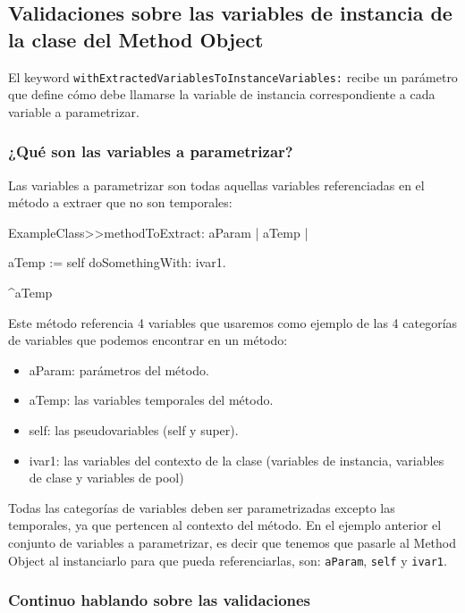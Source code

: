 \subsection*{Validaciones sobre las variables de instancia de la clase del Method Object}

El keyword \lstinline{withExtractedVariablesToInstanceVariables:} recibe un parámetro que define
cómo debe llamarse la variable de instancia correspondiente a cada variable a parametrizar. 

\subsubsection*{¿Qué son las variables a parametrizar?}
Las variables a parametrizar son todas aquellas variables referenciadas en el método a extraer que
no son temporales:

\begin{code}
ExampleClass>>methodToExtract: aParam
    | aTemp |

    aTemp := self doSomethingWith: ivar1.
    
    ^aTemp
\end{code}

Este método referencia 4 variables que usaremos como ejemplo de las 4 categorías de variables que podemos
encontrar en un método:

\begin{itemize}
    \item aParam: parámetros del método.
    \item aTemp: las variables temporales del método.
    \item self: las pseudovariables (self y super).
    \item ivar1: las variables del contexto de la clase (variables de instancia, variables de clase y variables de pool)
\end{itemize}

Todas las categorías de variables deben ser parametrizadas excepto las temporales, ya que pertencen
al contexto del método. En el ejemplo anterior el conjunto de variables a parametrizar, es decir que
tenemos que pasarle al Method Object al instanciarlo para que pueda referenciarlas, son: \lstinline{aParam},
\lstinline{self} y \lstinline{ivar1}.

\subsubsection{Continuo hablando sobre las validaciones}

